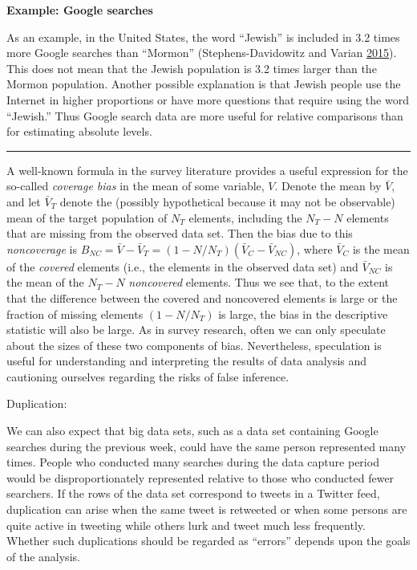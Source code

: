 \documentclass[]{krantz}
\begin{document}
\textbf{Example: Google searches}

As an example, in the United States, the word ``Jewish'' is included in
3.2 times more Google searches than ``Mormon'' (Stephens-Davidowitz and
Varian \protect\hyperlink{ref-SDV2015}{2015}). This does not mean that
the Jewish population is 3.2 times larger than the Mormon population.
Another possible explanation is that Jewish people use the Internet in
higher proportions or have more questions that require using the word
``Jewish.'' Thus Google search data are more useful for relative
comparisons than for estimating absolute levels.

\begin{center}\rule{0.5\linewidth}{\linethickness}\end{center}

A well-known formula in the survey literature provides a useful
expression for the so-called \emph{coverage bias} in the mean of some
variable, \(V\). Denote the mean by \(\bar{V}\), and let \(\bar{V}_T\)
denote the (possibly hypothetical because it may not be observable) mean
of the target population of \(N_{T}\) elements, including the
\(N_{T}-N\) elements that are missing from the observed data set. Then
the bias due to this \emph{noncoverage} is
\(B_{NC} = \bar{V} - \bar{V}_T = (1 - N / N_T )(\bar{V}_C - \bar{V}_{NC})\),
where \(\bar{V}_C\) is the mean of the \emph{covered} elements (i.e.,
the elements in the observed data set) and \(\bar{V}_{NC}\) is the mean
of the \(N_{T}-N\) \emph{noncovered} elements. Thus we see that, to the
extent that the difference between the covered and noncovered elements
is large or the fraction of missing elements \((1 - N / N_T)\) is large,
the bias in the descriptive statistic will also be large. As in survey
research, often we can only speculate about the sizes of these two
components of bias. Nevertheless, speculation is useful for
understanding and interpreting the results of data analysis and
cautioning ourselves regarding the risks of false inference.

Duplication:

We can also expect that big data sets, such as a data set containing
Google searches during the previous week, could have the same person
represented many times. People who conducted many searches during the
data capture period would be disproportionately represented relative to
those who conducted fewer searchers. If the rows of the data set
correspond to tweets in a Twitter feed, duplication can arise when the
same tweet is retweeted or when some persons are quite active in
tweeting while others lurk and tweet much less frequently. Whether such
duplications should be regarded as ``errors'' depends upon the goals of
the analysis.
\end{document}
